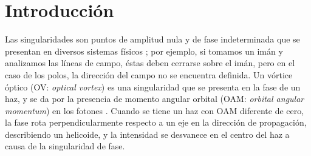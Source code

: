 \chapter{Introducción}
\label{cap:introduccion}


Las singularidades son puntos de amplitud nula y de fase indeterminada que se presentan en diversos sistemas físicos \cite{Dennis2009}; por ejemplo, si tomamos un imán y analizamos las líneas de campo, éstas deben cerrarse sobre el imán, pero en el caso de los polos, la dirección del campo no se encuentra definida. Un vórtice óptico (OV: \textit{optical vortex}) es una singularidad que se presenta en la fase de un haz, y se da por la presencia de momento angular orbital (OAM: \textit{orbital angular momentum}) en los fotones \cite{Uribe2011, Cheng2013}. Cuando se tiene un haz con OAM diferente de cero, la fase rota perpendicularmente respecto a un eje en la dirección de propagación, describiendo un helicoide, y la intensidad se desvanece en el centro del haz a causa de la singularidad de fase.\\


